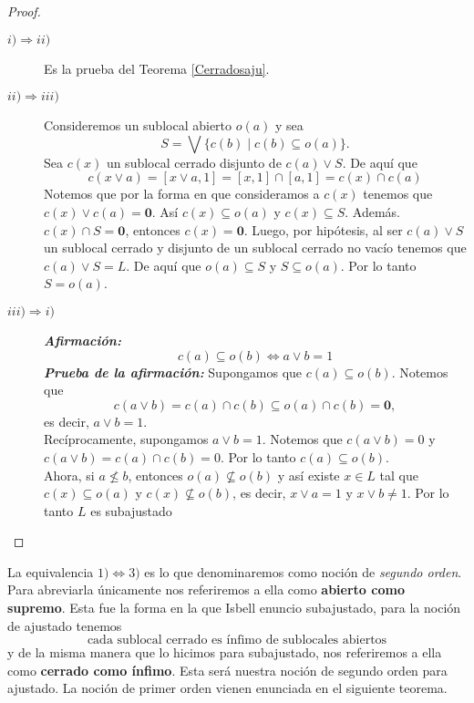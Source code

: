 \begin{proof}
    \begin{description}
        \item[$i)\Rightarrow ii)$] Es la prueba del Teorema \ref{Cerradosaju}.
        \item[$ii)\Rightarrow iii)$] Consideremos un sublocal abierto $o(a)$ y sea 
        \[
        S=\bigvee\{c(b)\mid c(b)\subseteq o(a)\}.
        \]
        Sea $c(x)$ un sublocal cerrado disjunto de $c(a)\vee S$. De aquí que 
        \[
        c(x\vee a)=[x\vee a, 1]=[x, 1]\cap [a, 1]=c(x)\cap c(a)
        \]
        Notemos que por la forma en que consideramos a $c(x)$ tenemos que $c(x)\vee c(a)=\mathbf{0}$. Así $c(x)\subseteq o(a)$ y $c(x)\subseteq S$. Además. $c(x)\cap S=\mathbf{0}$, entonces $c(x)=\mathbf{0}$. Luego, por hipótesis, al ser $c(a)\vee S$ un sublocal cerrado y disjunto de un sublocal cerrado no vacío tenemos que $c(a)\vee S=L$. De aquí que $o(a)\subseteq S$ y $S\subseteq o(a)$. Por lo tanto $S=o(a)$.
        \item[$iii)\Rightarrow i)$] \emph{\textbf{Afirmación:}} 
        \begin{equation}\label{c(a)yo(b)}
            c(a)\subseteq o(b)\Leftrightarrow a\vee b=1
        \end{equation}
        \emph{\textbf{Prueba de la afirmación:}} Supongamos que $c(a)\subseteq o(b)$. Notemos que 
        \[
        c(a\vee b)=c(a)\cap c(b)\subseteq o(a)\cap c(b)=\mathbf{0},
        \]
        es decir, $a\vee b=1$.\\

        \noindent
        Recíprocamente, supongamos $a\vee b=1$. Notemos que $c(a\vee b)=0$ y $c(a\vee b)=c(a)\cap c(b)=0$. Por lo tanto $c(a)\subseteq o(b)$.\\

        Ahora, si $a\nleq b$, entonces $o(a)\nsubseteq o(b)$ y así existe $x\in L$ tal que $c(x)\subseteq o(a)$ y $c(x)\nsubseteq o(b)$, es decir, $x\vee a=1$ y $x\vee b\neq 1$. Por lo tanto $L$ es subajustado
    \end{description}
\end{proof}

La equivalencia $1)\Leftrightarrow 3)$ es lo que denominaremos como noción de \emph{segundo orden}. Para abreviarla únicamente nos referiremos a ella como \textbf{abierto como supremo}. Esta fue la forma en la que Isbell enuncio subajustado, para la noción de ajustado tenemos 
\[
\mbox{cada sublocal cerrado es ínfimo de sublocales abiertos}
\]
y de la misma manera que lo hicimos para subajustado, nos referiremos a ella como \textbf{cerrado como ínfimo}. Esta será nuestra noción de segundo orden para ajustado. La noción de primer orden vienen enunciada en el siguiente teorema.

